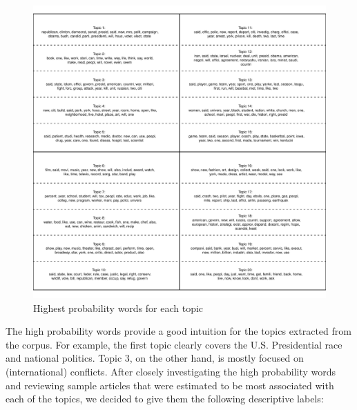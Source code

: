 \documentclass[12pt]{article}
\begin{document}
\begin{doublespace}
\begin{figure}[ht]
\caption{Highest probability words for each topic}\label{fig:words}
\includegraphics[width=\textwidth]{../calc/fig/words}
\end{figure}

The high probability words provide a good intuition for the topics extracted from the corpus. For example, the first topic clearly covers the U.S. Presidential race and national politics. Topic 3, on the other hand, is mostly focused on (international) conflicts. After closely investigating the high probability words and reviewing sample articles that were estimated to be most associated with each of the topics, we decided to give them the following descriptive labels:


\end{doublespace}
\end{document}

